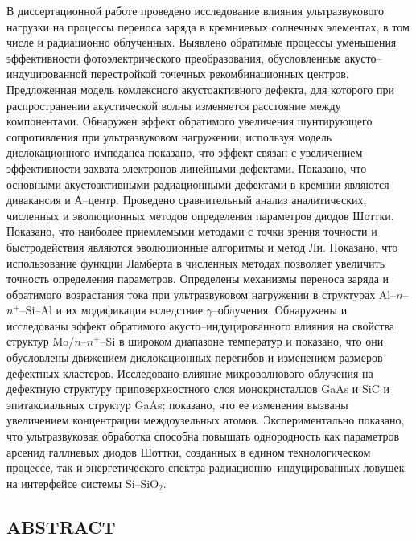 В диссертационной работе проведено исследование влияния ультразвукового нагрузки на процессы переноса заряда в кремниевых солнечных элементах,
 в том числе и радиационно облученных.
 Выявлено обратимые процессы уменьшения эффективности фотоэлектрического преобразования,
 обусловленные акусто--индуцированной перестройкой точечных рекомбинационных центров.
  Предложенная модель комлексного акустоактивного дефекта, для которого при распространении акустической волны изменяется расстояние между компонентами.
 Обнаружен эффект обратимого увеличения шунтирующего сопротивления при ультразвуковом нагружении;
используя модель дислокационного импеданса показано, что эффект связан с увеличением эффективности захвата электронов линейными дефектами.
 Показано, что основными акустоактивными радиационными дефектами в кремнии являются дивакансия и А--центр.
 Проведено сравнительный анализ аналитических, численных и эволюционных методов определения параметров диодов Шоттки.
 Показано, что наиболее приемлемыми методами с точки зрения точности и быстродействия являются эволюционные алгоритмы и метод Ли.
 Показано, что использование функции Ламберта в численных методах позволяет увеличить точность определения параметров.
 Определены механизмы переноса заряда и обратимого возрастания тока при ультразвуковом нагружении
 в структурах Al--$n$--$n^+$--Si--Al и их модификация вследствие $\gamma$--облучения.
 Обнаружены и исследованы эффект обратимого акусто--индуцированного влияния на свойства структур Mo/$n$--$n^{+}$--Si в широком диапазоне температур
 и показано, что они обусловлены движением дислокационных перегибов и изменением размеров дефектных кластеров.
 Исследовано влияние микроволнового облучения на дефектную структуру приповерхностного слоя монокристаллов GaAs и SiC и эпитаксиальных структур GaAs;
 показано,  что ее изменения вызваны увеличением концентрации междоузельных атомов.
 Экспериментально показано, что ультразвуковая обработка способна повышать однородность как параметров арсенид галлиевых диодов Шоттки, созданных в едином технологическом процессе, так и энергетического спектра радиационно--индуцированных ловушек на интерфейсе системы Si--SiO$_2$.


\keywordsRu


\begin{center}
{\section*{\MakeUppercase{ABSTRACT}}}
\end{center}

